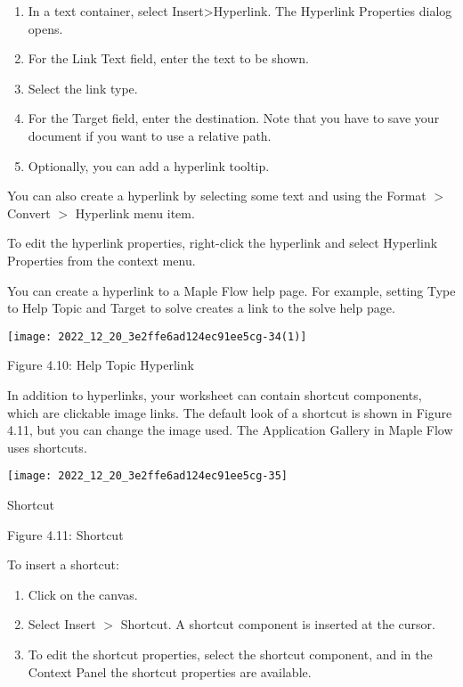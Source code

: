 \begin{enumerate}
  \item In a text container, select Insert>Hyperlink. The Hyperlink Properties dialog opens.

  \item For the Link Text field, enter the text to be shown.

  \item Select the link type.

  \item For the Target field, enter the destination. Note that you have to save your document if you want to use a relative path.

  \item Optionally, you can add a hyperlink tooltip.

\end{enumerate}

You can also create a hyperlink by selecting some text and using the Format $>$ Convert $>$ Hyperlink menu item.

To edit the hyperlink properties, right-click the hyperlink and select Hyperlink Properties from the context menu.

You can create a hyperlink to a Maple Flow help page. For example, setting Type to Help Topic and Target to solve creates a link to the solve help page.

\begin{center}
\texttt{[image: 2022\_12\_20\_3e2ffe6ad124ec91ee5cg-34(1)]}
\end{center}

Figure 4.10: Help Topic Hyperlink

In addition to hyperlinks, your worksheet can contain shortcut components, which are clickable image links. The default look of a shortcut is shown in Figure 4.11, but you can change the image used. The Application Gallery in Maple Flow uses shortcuts.

\begin{center}
\texttt{[image: 2022\_12\_20\_3e2ffe6ad124ec91ee5cg-35]}
\end{center}

Shortcut

Figure 4.11: Shortcut

To insert a shortcut:

\begin{enumerate}
  \item Click on the canvas.

  \item Select Insert $>$ Shortcut. A shortcut component is inserted at the cursor.

  \item To edit the shortcut properties, select the shortcut component, and in the Context Panel the shortcut properties are available.

\end{enumerate}


